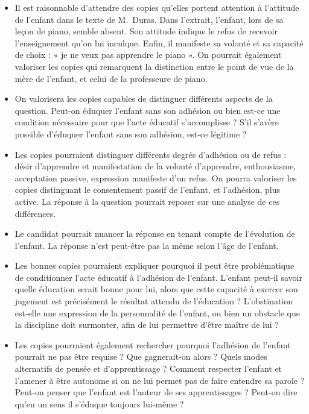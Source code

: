 		{\begin{itemize}
		\item Il est raisonnable d’attendre des copies qu’elles portent attention à l’attitude de
l’enfant dans le texte de M.~Duras. Dans l’extrait, l’enfant, lors de sa leçon de
piano, semble absent. Son attitude indique le refus de recevoir l’enseignement
qu’on lui inculque. Enfin, il manifeste sa volonté et sa capacité de choix : « je
ne veux pas apprendre le piano ». On pourrait également valoriser les copies
qui remarquent la distinction entre le point de vue de la mère de l’enfant, et celui
de la professeure de piano.

\item On valorisera les copies capables de distinguer différents aspects de la
question. Peut-on éduquer l’enfant sans son adhésion ou bien est-ce une
condition nécessaire pour que l’acte éducatif s’accomplisse ? S’il s’avère
possible d’éduquer l’enfant sans son adhésion, est-ce légitime ?

\item Les copies pourraient distinguer différents degrés d’adhésion ou de refus : désir
d’apprendre et manifestation de la volonté d’apprendre, enthousiasme,
acceptation passive, expression manifeste d’un refus. On pourra valoriser les
copies distinguant le consentement passif de l’enfant, et l’adhésion, plus active.
La réponse à la question pourrait reposer sur une analyse de ces différences.

\item Le candidat pourrait nuancer la réponse en tenant compte de l’évolution de
l’enfant. La réponse n’est peut-être pas la même selon l’âge de l’enfant.

\item Les bonnes copies pourraient expliquer pourquoi il peut être problématique de
conditionner l’acte éducatif à l’adhésion de l’enfant. L’enfant peut-il savoir quelle
éducation serait bonne pour lui, alors que cette capacité à exercer son jugement
est précisément le résultat attendu de l’éducation ? L’obstination est-elle une
expression de la personnalité de l’enfant, ou bien un obstacle que la discipline
doit surmonter, afin de lui permettre d’être maître de lui ?

\item Les copies pourraient également rechercher pourquoi l’adhésion de l’enfant
pourrait ne pas être requise ? Que gagnerait-on alors ? Quels modes alternatifs
de pensée et d’apprentissage ? Comment respecter l’enfant et l’amener à être
autonome si on ne lui permet pas de faire entendre sa parole ? Peut-on penser
que l’enfant est l’auteur de ses apprentissages ? Peut-on dire qu’en un sens il
s’éduque toujours lui-même ?
		\end{itemize}}%

